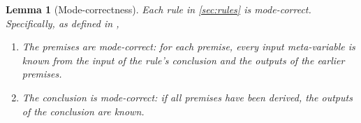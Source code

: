 \documentclass[a4,natbib=false]{article}
\newtheorem{lemma}{Lemma}
\begin{document}

\begin{lemma}[Mode-correctness]
  Each rule in \cref{sec:rules} is mode-correct. Specifically, as defined in \cite{dunfield2021:bidirectional},
  \begin{enumerate}
    \item The premises are mode-correct: for each premise, every input meta-variable is known from the input of the rule's conclusion and the outputs of the earlier premises.
    \item The conclusion is mode-correct: if all premises have been derived, the outputs of the conclusion are known.
  \end{enumerate}
\end{lemma}
\end{document}
